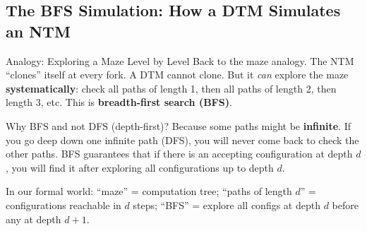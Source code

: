 \documentclass[11pt,a4paper]{article}
\begin{document}
\subsection{The BFS Simulation: How a DTM Simulates an NTM}

\begin{notebox}{Analogy: Exploring a Maze Level by Level}
Back to the maze analogy. The NTM ``clones'' itself at every fork. A DTM cannot clone. But it \textit{can} explore the maze \textbf{systematically}: check all paths of length 1, then all paths of length 2, then length 3, etc. This is \textbf{breadth-first search (BFS)}.

Why BFS and not DFS (depth-first)? Because some paths might be \textbf{infinite}. If you go deep down one infinite path (DFS), you will never come back to check the other paths. BFS guarantees that if there is an accepting configuration at depth $d$, you will find it after exploring all configurations up to depth $d$.

In our formal world: ``maze'' = computation tree; ``paths of length $d$'' = configurations reachable in $d$ steps; ``BFS'' = explore all configs at depth $d$ before any at depth $d+1$.
\end{notebox}
\end{document}
